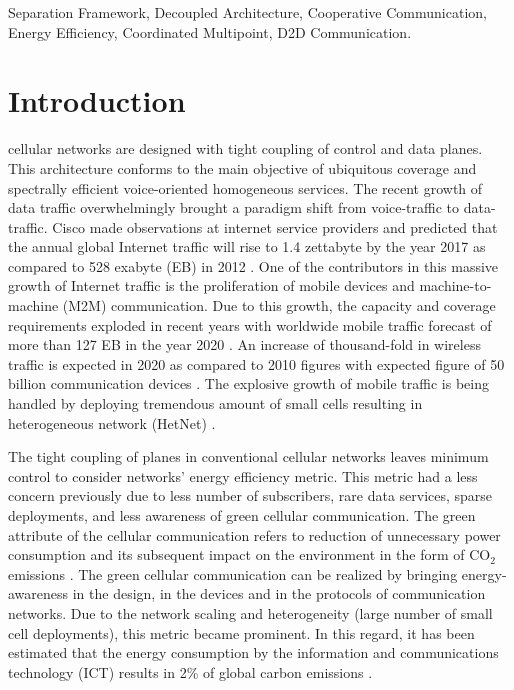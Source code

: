 \documentclass[article,10pt,twocolumn]{IEEEtran}
\begin{document}
\begin{IEEEkeywords}
Separation Framework, Decoupled Architecture, Cooperative Communication, Energy Efficiency, Coordinated Multipoint, D2D Communication.
\end{IEEEkeywords}

\section{Introduction} \label{sec:introduction}
 cellular networks are designed with tight coupling of control and data planes. This architecture conforms to the main objective of ubiquitous coverage and spectrally efficient voice-oriented homogeneous services. The recent growth of data traffic overwhelmingly brought a paradigm shift from voice-traffic to data-traffic. Cisco made observations at internet service providers and predicted that the annual global Internet traffic will rise to 1.4 zettabyte by the year 2017 as compared to 528 exabyte (EB) in 2012 \citep{Cisco}. One of the contributors in this massive growth of Internet traffic is the proliferation of mobile devices and machine-to-machine (M2M) communication. Due to this growth, the capacity and coverage requirements exploded in recent years with worldwide mobile traffic forecast of more than 127 EB in the year 2020 \citep{UMTS_2011}. An increase of thousand-fold in wireless traffic is expected in 2020 as compared to 2010 figures \citep{6692781} with expected figure of 50 billion communication devices \citep{Ericsson_2011}. The explosive growth of mobile traffic is being handled by deploying tremendous amount of small cells resulting in heterogeneous network (HetNet) \citep{6171992}.

The tight coupling of planes in conventional cellular networks leaves minimum control to consider networks' energy efficiency metric. This metric had a less concern previously due to less number of subscribers, rare data services, sparse deployments, and less awareness of green cellular communication. The green attribute of the cellular communication refers to reduction of unnecessary power consumption and its subsequent impact on the environment in the form of CO$_2$ emissions \citep{5677351,wu_green_2012,scott_matthews_planning_2010,5978416,6848019,6525595}. The green cellular communication can be realized by bringing energy-awareness in the design, in the devices \citep{4205092} and in the protocols of communication networks. Due to the network scaling and heterogeneity (large number of small cell deployments), this metric became prominent. In this regard, it has been estimated that the energy consumption by the information and communications technology (ICT) results in 2\% of global carbon emissions \citep{6100924}.
\end{document}
